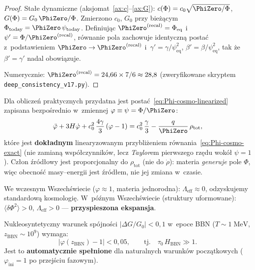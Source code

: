 \begin{proof}
Sta\l{}e dynamiczne (aksjomat~\ref{ax:c}--\ref{ax:G}):
$c(\Phi) = c_0\sqrt{\PhiZero/\Phi}$,
$G(\Phi) = G_0\,\PhiZero/\Phi$.
Zmierzono $c_0$, $G_0$ przy bie\.z\k{a}cym $\Phi_{\mathrm{today}}
= \PhiZero\,\psi_{\mathrm{today}}$.
Definiuj\k{a}c $\PhiZero^{(\mathrm{recal})} = \Phi_{\mathrm{eq}}$
i~$\psi' = \Phi/\PhiZero^{(\mathrm{recal})}$, r\'ownanie pola zachowuje
identyczn\k{a} posta\'c z~podstawieniem $\PhiZero \to \PhiZero^{(\mathrm{recal})}$
i~$\gamma' = \gamma/\psi_{\mathrm{eq}}^2$, $\beta' = \beta/\psi_{\mathrm{eq}}^2$,
tak \.ze $\beta' = \gamma'$ nadal obowi\k{a}zuje.

Numerycznie: $\PhiZero^{(\mathrm{recal})} = 24{,}66 \times 7/6 \approx 28{,}8$
(zweryfikowane skryptem \texttt{deep\_consistency\_v17.py}).
\end{proof}

\medskip
Dla oblicze\'n praktycznych przydatna jest posta\'c~\eqref{eq:Phi-cosmo-linearized}
zapisana bezpo\'srednio w~zmiennej $\varphi \equiv \psi = \Phi/\PhiZero$:
\begin{equation}\label{eq:Phi-cosmo}
  \ddot{\varphi} + 3H\dot{\varphi}
  + c_0^2\,\frac{4\gamma}{3}\,(\varphi - 1)
  = c_0^2\,\frac{\gamma}{3}
  - \frac{q}{\PhiZero}\,\rho_{\mathrm{tot}},
\end{equation}
kt\'ore jest \textbf{dok\l{}adnym} linearyzowanym przybli\.zeniem
r\'ownania~\eqref{eq:Phi-cosmo-exact} (nie zamian\k{a} wsp\'o\l{}czynnik\'ow,
lecz \emph{Taylor}em pierwszego rz\k{e}du wok\'o\l{} $\psi = 1$).
Cz\l{}on \'zr\'od\l{}owy jest proporcjonalny do
$\rho_{\mathrm{tot}}$ (nie do $\dot{\rho}$):
materia \emph{generuje} pole $\Phi$, wi\k{e}c
obecno\'s\'c masy--energii jest \'zr\'od\l{}em, nie
jej zmiana w~czasie.

We wczesnym Wszech\'swiecie ($\varphi \approx 1$, materia
jednorodna): $\Lambda_{\mathrm{eff}} \approx 0$, odzyskujemy
standardow\k{a} kosmologi\k{e}. W~p\'o\'znym Wszech\'swiecie
(struktury uformowane): $\langle\delta\Phi^2\rangle > 0$,
$\Lambda_{\mathrm{eff}} > 0$ --- \textbf{przyspieszona ekspansja}.

\begin{proposition}\label{prop:BBN-constraint}
Nukleosyntetyczny waru\-nek sp\'ojno\'sci
$|\Delta G/G_0| < 0{,}1$ w~epoce BBN ($T \sim 1\;\mathrm{MeV}$,
$z_{\mathrm{BBN}} \sim 10^9$) wymaga:
\begin{equation}\label{eq:BBN-bound}
  |\varphi(z_{\mathrm{BBN}}) - 1| < 0{,}05,
  \qquad\text{tj.}\quad
  \tau_0\,H_{\mathrm{BBN}} \gg 1.
\end{equation}
Jest to \textbf{automatycznie spe\l{}nione} dla naturalnych warunk\'ow
pocz\k{a}tkowych ($\varphi_{\mathrm{ini}} = 1$ po przej\'sciu fazowym).
\end{proposition}

